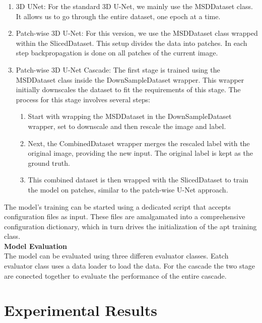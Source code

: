 \begin{enumerate}
	\item 3D UNet: For the standard 3D U-Net, we mainly use the MSDDataset class. It allows us to go through the entire dataset, one epoch at a time.
	\item Patch-wise 3D U-Net: For this version, we use the MSDDataset class wrapped within the SlicedDataset. This setup divides the data into patches.
	In each step backpropagation is done on all patches of the current image.
	\item Patch-wise 3D U-Net Cascade: The first stage is trained using the MSDDataset class inside the DownSampleDataset wrapper. This wrapper initially downscales the dataset to fit the requirements of this stage.
	The process for this stage involves several steps:
	\begin{enumerate}
		\item Start with wrapping the MSDDataset in the DownSampleDataset wrapper, set to downscale and then rescale the image and label.
		\item Next, the CombinedDataset wrapper merges the rescaled label with the original image, providing the new input. The original label is kept as the ground truth.
		\item This combined dataset is then wrapped with the SlicedDataset to train the model on patches, similar to the patch-wise U-Net approach.
	\end{enumerate}
\end{enumerate}

The model's training can be started using a dedicated script that accepts configuration files as input. These files are amalgamated into a comprehensive configuration dictionary,
which in turn drives the initialization of the apt training class.\\[1ex]
\textbf{Model Evaluation}\\
The model can be evaluated using three differen evaluator classes. Eatch evaluator class uses a data loader to load the data.
For the cascade the two stage are conected together to evaluate the performance of the entire cascade.

\chapter{Experimental Results}

